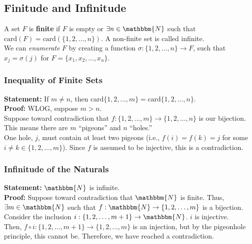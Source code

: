\documentclass[10pt]{extarticle}
\begin{document}
    \subsection{Finitude and Infinitude}%
      A set $F$ is \textbf{finite} if $F$ is empty or $\exists n\in \mathbbm{N}$ such that $\text{card}(F) = \text{card}\left(\{1,2,\dots,n\}\right)$. A non-finite set is called infinite.\\

      We can \textsl{enumerate} $F$ by creating a function $\sigma: \{1,2,\dots,n\}\rightarrow F$, such that $x_j = \sigma(j)$ for $F = \{x_1,x_2,\dots,x_n\}$.
      \subsubsection{Inequality of Finite Sets}%
      \textbf{Statement:} If $m\neq n$, then $\text{card}\{1,2,\dots,m\} = \text{card}\{1,2,\dots,n\}$.\\
      
      \textbf{Proof:} WLOG, suppose $m>n$.\\

      Suppose toward contradiction that $f: \{1,2,\dots,m\} \rightarrow \{1,2,\dots,n\}$ is our bijection. This means there are $m$ ``pigeons'' and $n$ ``holes.''\\

      One hole, $j$, must contain at least two pigeons (i.e., $f(i) = f(k) = j$ for some $i\neq k\in \{1,2,\dots,m\}$). Since $f$ is assumed to be injective, this is a contradiction.\\
      \subsubsection{Infinitude of the Naturals}%
      \textbf{Statement:} $\mathbbm{N}$ is infinite.\\

      \textbf{Proof:} Suppose toward contradiction that $\mathbbm{N}$ is finite. Thus, $\exists m\in \mathbbm{N}$ such that $f:\mathbbm{N} \rightarrow \{1,2,\dots,m\}$ is a bijection.\\

      Consider the inclusion $i: \{1,2,\dots,m+1\}\rightarrow \mathbbm{N}$. $i$ is injective.\\

      Then, $f\circ i: \{1,2,\dots,m+1\} \rightarrow \{1,2,\dots,m\}$ is an injection, but by the pigeonhole principle, this cannot be. Therefore, we have reached a contradiction.\\
\end{document}
